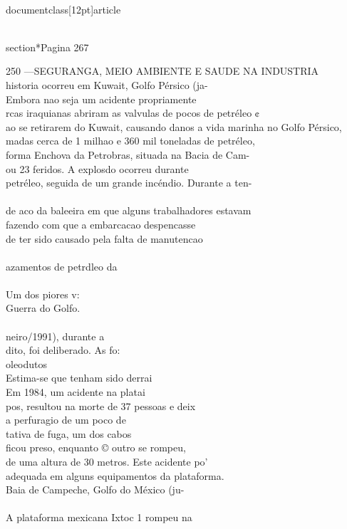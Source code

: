 \\documentclass[12pt]{article}
\begin{document}
{{{{{\\section*{Pagina 267}

250 —SEGURANGA, MEIO AMBIENTE E SAUDE NA INDUSTRIA\\
historia ocorreu em Kuwait, Golfo Pérsico (ja-\\
Embora nao seja um acidente propriamente\\
rcas iraquianas abriram as valvulas de pocos de petréleo ¢\\
ao se retirarem do Kuwait, causando danos a vida marinha no Golfo Pérsico,\\
madas cerca de 1 milhao e 360 mil toneladas de petréleo,\\
forma Enchova da Petrobras, situada na Bacia de Cam-\\
ou 23 feridos. A explosdo ocorreu durante\\
petréleo, seguida de um grande incéndio. Durante a ten-\\
\\
de aco da baleeira em que alguns trabalhadores estavam\\
fazendo com que a embarcacao despencasse\\
de ter sido causado pela falta de manutencao\\
\\
azamentos de petrdleo da\\
\\
Um dos piores v:\\
Guerra do Golfo.\\
\\
neiro/1991), durante a\\
dito, foi deliberado. As fo:\\
oleodutos\\
Estima-se que tenham sido derrai\\
Em 1984, um acidente na platai\\
pos, resultou na morte de 37 pessoas e deix\\
a perfuragio de um poco de\\
tativa de fuga, um dos cabos\\
ficou preso, enquanto © outro se rompeu,\\
de uma altura de 30 metros. Este acidente po’\\
adequada em alguns equipamentos da plataforma.\\
Baia de Campeche, Golfo do México (ju-\\
\\
A plataforma mexicana Ixtoc 1 rompeu na\\
}}}}}
\end{document}
